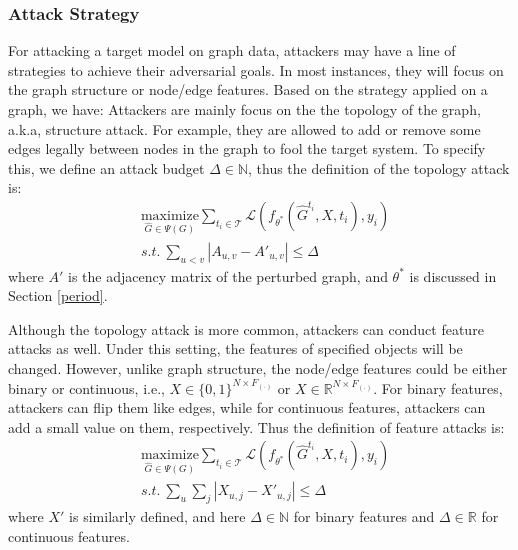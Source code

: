 \subsubsection{Attack Strategy}
For attacking a target model on graph data, attackers may have a line of strategies to achieve their adversarial goals. In most instances, they will focus on the graph structure or node/edge features. Based on the strategy applied on a graph, we have:
Attackers are mainly focus on the the topology of the graph, a.k.a, structure attack. For example, they are allowed to add or remove some edges legally between nodes in the graph to fool the target system. To specify this, we define an attack budget $\Delta \in \mathbb{N}$, thus the definition of the topology attack is:
\begin{equation}
	\begin{aligned}
		 & \underset{\hat{G} \in \Psi(G)} {\text{maximize}} \sum_{t_i \in \mathcal{T}} \mathcal{L}(f_{\theta^*}(\hat{G}^{t_i},X,t_i),y_i) \\
		 & s.t. \  \sum_{u<v} |A_{u,v}-A'_{u,v} | \leq \Delta
	\end{aligned}
\end{equation}
where $A'$ is the adjacency matrix of the perturbed graph, and $\theta^*$ is discussed in Section \ref{period}.

Although the topology attack is more common, attackers can conduct feature attacks as well. Under this setting, the features of specified objects will be changed. However, unlike graph structure, the node/edge features could be either binary or continuous, i.e., $X \in \{0,1\}^{N \times F_{(\cdot)}}$ or $X \in \mathbb{R}^{N \times F_{(\cdot)}}$. For binary features, attackers can flip them like edges, while for continuous features, attackers can add a small value on them, respectively. Thus the definition of feature attacks is:
\begin{equation}
	\begin{aligned}
		 & \underset{\hat{G} \in \Psi(G)} {\text{maximize}} \sum_{t_i \in \mathcal{T}} \mathcal{L}(f_{\theta^*}(\hat{G}^{t_i},X,t_i),y_i) \\
		 & s.t. \  \sum_u \sum_j  |X_{u,j}-X'_{u,j} | \leq \Delta
	\end{aligned}
\end{equation}
where $X'$ is similarly defined, and  here $\Delta \in \mathbb{N}$ for binary features and $\Delta \in \mathbb{R}$ for continuous features.

